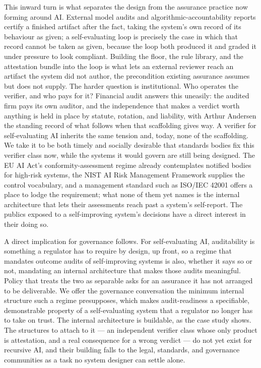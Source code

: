 \documentclass[11pt]{article}
\begin{document}
This inward turn is what separates the design from the assurance practice now forming around AI. External model audits and algorithmic-accountability reports certify a finished artifact after the fact, taking the system's own record of its behaviour as given; a self-evaluating loop is precisely the case in which that record cannot be taken as given, because the loop both produced it and graded it under pressure to look compliant. Building the floor, the rule library, and the attestation bundle into the loop is what lets an external reviewer reach an artifact the system did not author, the precondition existing assurance assumes but does not supply. The harder question is institutional. Who operates the verifier, and who pays for it? Financial audit answers this uneasily: the audited firm pays its own auditor, and the independence that makes a verdict worth anything is held in place by statute, rotation, and liability, with Arthur Andersen the standing record of what follows when that scaffolding gives way. A verifier for self-evaluating AI inherits the same tension and, today, none of the scaffolding. We take it to be both timely and socially desirable that standards bodies fix this verifier class now, while the systems it would govern are still being designed. The EU AI Act's conformity-assessment regime already contemplates notified bodies for high-risk systems, the NIST AI Risk Management Framework supplies the control vocabulary, and a management standard such as ISO/IEC 42001 offers a place to lodge the requirement; what none of them yet names is the internal architecture that lets their assessments reach past a system's self-report. The publics exposed to a self-improving system's decisions have a direct interest in their doing so.

A direct implication for governance follows. For self-evaluating AI, auditability is something a regulator has to require by design, up front, so a regime that mandates outcome audits of self-improving systems is also, whether it says so or not, mandating an internal architecture that makes those audits meaningful. Policy that treats the two as separable asks for an assurance it has not arranged to be deliverable. We offer the governance conversation the minimum internal structure such a regime presupposes, which makes audit-readiness a specifiable, demonstrable property of a self-evaluating system that a regulator no longer has to take on trust. The internal architecture is buildable, as the case study shows. The structures to attach to it --- an independent verifier class whose only product is attestation, and a real consequence for a wrong verdict --- do not yet exist for recursive AI, and their building falls to the legal, standards, and governance communities as a task no system designer can settle alone.
\end{document}
